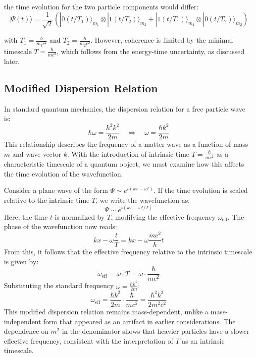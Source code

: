 \documentclass{article}
\begin{document}
	the time evolution for the two particle components would differ:
	\begin{equation}
		|\Psi(t)\rangle = \frac{1}{\sqrt{2}}(|0(t/T_1)\rangle_{m_1} \otimes |1(t/T_2)\rangle_{m_2} + |1(t/T_1)\rangle_{m_1} \otimes |0(t/T_2)\rangle_{m_2})
	\end{equation}
	
	with $T_1 = \frac{\hbar}{m_1 c^2}$ and $T_2 = \frac{\hbar}{m_2 c^2}$. However, coherence is limited by the minimal timescale $T = \frac{\hbar}{mc^2}$, which follows from the energy-time uncertainty, as discussed later.
	
	\subsection{Modified Dispersion Relation}
	
	In standard quantum mechanics, the dispersion relation for a free particle wave is:
	\begin{equation}
		\hbar \omega = \frac{\hbar^2 k^2}{2m} \quad \Rightarrow \quad \omega = \frac{\hbar k^2}{2m}
	\end{equation}
	This relationship describes the frequency of a matter wave as a function of mass $m$ and wave vector $k$. With the introduction of intrinsic time $T = \frac{\hbar}{mc^2}$ as a characteristic timescale of a quantum object, we must examine how this affects the time evolution of the wavefunction.
	
	Consider a plane wave of the form $\Psi \sim e^{i(kx - \omega t)}$. If the time evolution is scaled relative to the intrinsic time $T$, we write the wavefunction as:
	\begin{equation}
		\Psi \sim e^{i(kx - \omega t / T)}
	\end{equation}
	Here, the time $t$ is normalized by $T$, modifying the effective frequency $\omega_{\text{eff}}$. The phase of the wavefunction now reads:
	\begin{equation}
		kx - \omega \frac{t}{T} = kx - \omega \frac{mc^2}{\hbar} t
	\end{equation}
	From this, it follows that the effective frequency relative to the intrinsic timescale is given by:
	\begin{equation}
		\omega_{\text{eff}} = \omega \cdot T = \omega \cdot \frac{\hbar}{mc^2}
	\end{equation}
	Substituting the standard frequency $\omega = \frac{\hbar k^2}{2m}$:
	\begin{equation}
		\omega_{\text{eff}} = \frac{\hbar k^2}{2m} \cdot \frac{\hbar}{mc^2} = \frac{\hbar^2 k^2}{2 m^2 c^2}
	\end{equation}
	This modified dispersion relation remains mass-dependent, unlike a mass-independent form that appeared as an artifact in earlier considerations. The dependence on $m^2$ in the denominator shows that heavier particles have a slower effective frequency, consistent with the interpretation of $T$ as an intrinsic timescale.
	
\end{document}
